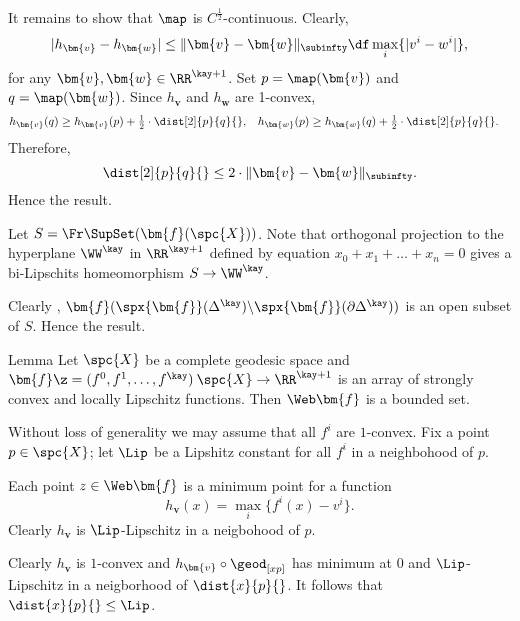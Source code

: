 It remains to show that $\map $ is $C^{\frac{1}{2}}$-continuous.
Clearly, 
$$|h_{\bm{v}}-h_{\bm{w}}|
\le\|\bm{v}-\bm{w}\|_\subinfty
\df
\max_{i}\{|v^i-w^i|\},$$
for any $\bm{v},\bm{w}\in\RR^{\kay+1}$.
Set $p=\map (\bm{v})$ and $q=\map (\bm{w})$.
Since $h_{\bm{v}}$ and $h_{\bm{w}}$ are 1-convex,
\begin{align*}
h_{\bm{v}}(q)
&\ge 
h_{\bm{v}}(p)+\tfrac{1}{2}\cdot\dist[2]{p}{q}{},
&
h_{\bm{w}}(p)
&\ge 
h_{\bm{w}}(q)+\tfrac{1}{2}\cdot\dist[2]{p}{q}{}.
\end{align*}
Therefore,
$$\dist[2]{p}{q}{}\le 2\cdot\|\bm{v}-\bm{w}\|_\subinfty.$$
Hence the result.


Let $S=\Fr\SupSet(\bm{f}(\spc{X}))$.
Note that orthogonal projection to the hyperplane $\WW^\kay$ in $\RR^{\kay+1}$ defined by equation $x_0+x_1+\dots+x_n=0$ gives a bi-Lipschits homeomorphism $S\to \WW^\kay$.

Clearly%
, $\bm{f}({\spx{\bm{f}}(\Delta^\kay)}\backslash\spx{\bm{f}}(\partial\Delta^\kay))$ 
is an open subset of $S$.
Hence the result.
\qeds













\begin{thm}{Lemma}
Let $\spc{X}$ be a complete geodesic space 
and $\bm{f}\z=(f^0,f^1,\dots,f^\kay)\:\spc{X}\to\RR^{\kay+1}$ 
is an array of strongly convex and locally Lipschitz functions.
Then 
$\Web\bm{f}$ is a bounded set.
\end{thm}

Without loss of generality we may assume that all $f^i$ are $1$-convex.
Fix a point $p\in\spc{X}$;
let $\Lip$ be a Lipshitz constant for all $f^i$ in a neighbohood of $p$.

Each point $z\in \Web\bm{f}$ is a minimum point for a function
$$h_{\bm{v}}(x)=\max_i\{f^i(x)-v^i\}.$$
Clearly $h_{\bm{v}}$ is $\Lip$-Lipschitz in a neigbohood of $p$.

Clearly $h_{\bm{v}}$ is $1$-convex and $h_{\bm{v}}\circ\geod_{[xp]}$ has minimum at $0$ and $\Lip$-Lipschitz in a neigborhood of $\dist{x}{p}{}$.
It follows that $\dist{x}{p}{}\le \Lip$.
\qeds














